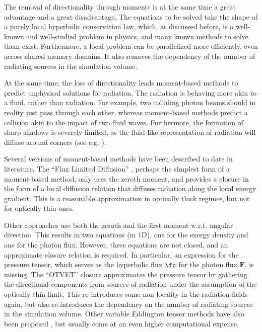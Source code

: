 The removal of directionality through moments is at the same time a great advantage and a great
disadvantage. The equations to be solved take the shape of a purely local hyperbolic conservation
law, which, as discussed before, is a well-known and well-studied problem in physics, and many known methods to solve them exist. Furthermore, a local problem can be parallelized more efficiently, even across shared memory domains. It also removes the dependency of the number of radiating sources in the simulation volume.

At the same time, the loss of directionality leads moment-based methods to predict unphysical
solutions for radiation. The radiation is behaving more akin to a fluid, rather than radiation. For
example, two colliding photon beams should in reality just pass through each other, whereas
moment-based methods predict a collision akin to the impact of two fluid waves. Furthermore, the
formation of sharp shadows is severely limited, as the fluid-like representation of radiation will
diffuse around corners (see e.g. \citet{ramses-rt13}).

Several versions of moment-based methods have been described to date in literature. The ``Flux Limited Diffusion'' \citep[e.g.][]{commerconRadiationHydrodynamicsAdaptive2011,
normanSimulatingCosmologicalEvolution2007a}, perhaps the simplest form of a moment-based method, only uses the zeroth moment, and provides a closure in the form of a local diffusion relation that
diffuses radiation along the local energy gradient. This is a reasonable approximation in optically thick regimes, but not for optically thin ones.

Other approaches use both the zeroth and the first moment w.r.t. angular direction. This results in
two equations (in 1D), one for the energy density and one for the photon flux. However, these
equations are not closed, and an approximate closure relation is required. In particular, an
expression for the pressure tensor, which serves as the hyperbolic flux $\fc$ for the photon flux
$\mathbf{F}$, is missing. The ``OTVET'' \citep[``Optically Thin Variable Eddington Tensor'',
e.g.][]{gnedinMultidimensionalCosmologicalRadiative2001, petkovaImplementationRadiativeTransfer2009} closure
approximates the pressure tensor by gathering the directional components from sources of radiation
under the assumption of the optically thin limit. This re-introduces some non-locality in the
radiation fields again, but also re-introduces the dependency on the number of radiating sources in the simulation volume. Other variable Eddington tensor methods have also been proposed
\citep[e.g.][]{finlatorNewMomentMethod2009,menonVETTAMSchemeRadiation2022}, but usually come at an
even higher computational expense.


